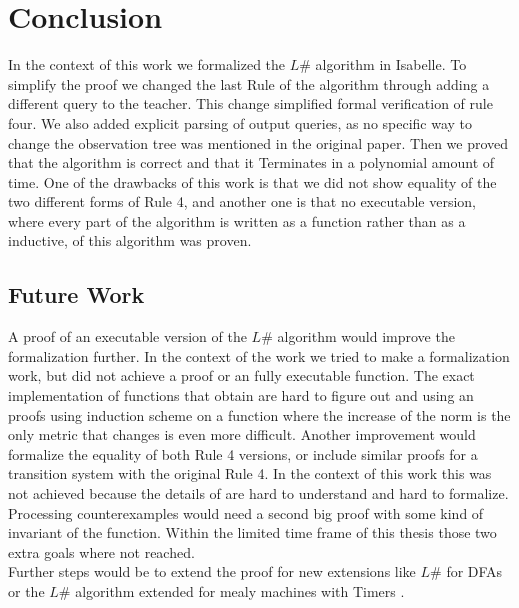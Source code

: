 \chapter{Conclusion}
In the context of this work we formalized the $L\#$ algorithm in Isabelle. To simplify the proof we changed the last Rule of the algorithm through adding a different query to the teacher. This change simplified formal verification of rule four. We also added explicit parsing of output queries, as no specific way to change the observation tree was mentioned in the original paper. Then we proved that the algorithm is correct and that it Terminates in a polynomial amount of time. One of the drawbacks of this work is that we did not show equality of the two different forms of Rule 4, and another one is that no executable version, where every part of the algorithm is written as a function rather than as a inductive, of this algorithm was proven.
\section{Future Work}
A proof of an executable version of the $L\#$ algorithm would improve the formalization further. In the context of the work we tried to make a formalization work, but did not achieve a proof or an fully executable function. The exact implementation of functions that obtain are hard to figure out and using an proofs using induction scheme on a function where the increase of the norm is the only metric that changes is even more difficult. Another improvement would formalize the equality of both Rule 4 versions, or include similar proofs for a transition system with the original Rule 4. In the context of this work this was not achieved because the details of \proccon\space are hard to understand and hard to formalize. Processing counterexamples would need a second big proof with some kind of invariant of the function. Within the limited time frame of this thesis those two extra goals where not reached. \\
Further steps would be to extend the proof for new extensions like $L\#$ for DFAs \cite{DBLP:conf/birthday/VaandragerS25} or the $L\#$ algorithm extended for mealy machines with Timers \cite{DBLP:journals/corr/abs-2403-02019}.
 
